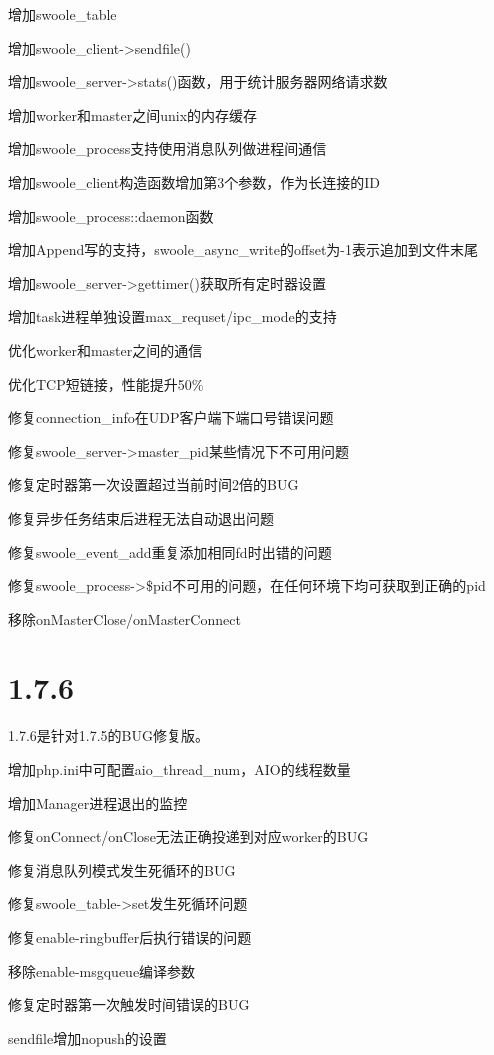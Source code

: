 \begin{compactitem}
\item 增加swoole\_table
\item 增加swoole\_client->sendfile()
\item 增加swoole\_server->stats()函数，用于统计服务器网络请求数
\item 增加worker和master之间unix的内存缓存
\item 增加swoole\_process支持使用消息队列做进程间通信
\item 增加swoole\_client构造函数增加第3个参数，作为长连接的ID
\item 增加swoole\_process::daemon函数
\item 增加Append写的支持，swoole\_async\_write的offset为-1表示追加到文件末尾
\item 增加swoole\_server->gettimer()获取所有定时器设置
\item 增加task进程单独设置max\_requset/ipc\_mode的支持
\item 优化worker和master之间的通信
\item 优化TCP短链接，性能提升50\%
\item 修复connection\_info在UDP客户端下端口号错误问题
\item 修复swoole\_server->master\_pid某些情况下不可用问题
\item 修复定时器第一次设置超过当前时间2倍的BUG
\item 修复异步任务结束后进程无法自动退出问题
\item 修复swoole\_event\_add重复添加相同fd时出错的问题
\item 修复swoole\_process->\$pid不可用的问题，在任何环境下均可获取到正确的pid
\item 移除onMasterClose/onMasterConnect
\end{compactitem}

\section{1.7.6}

1.7.6是针对1.7.5的BUG修复版。

\begin{compactitem}
\item 增加php.ini中可配置aio\_thread\_num，AIO的线程数量
\item 增加Manager进程退出的监控
\item 修复onConnect/onClose无法正确投递到对应worker的BUG
\item 修复消息队列模式发生死循环的BUG
\item 修复swoole\_table->set发生死循环问题
\item 修复enable-ringbuffer后执行错误的问题
\item 移除enable-msgqueue编译参数
\item 修复定时器第一次触发时间错误的BUG
\item sendfile增加nopush的设置
\end{compactitem}


